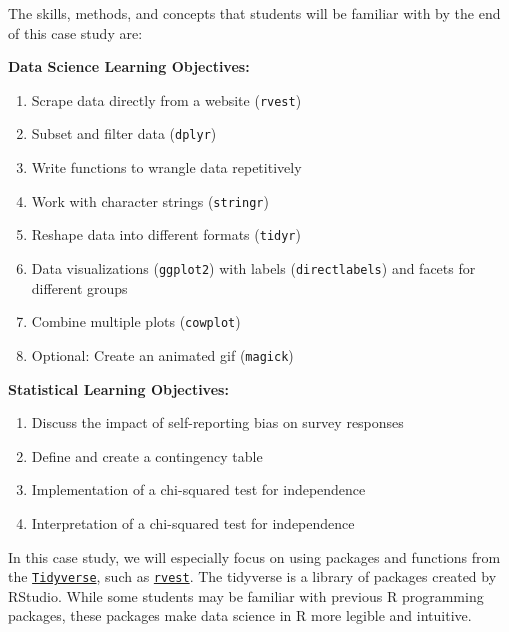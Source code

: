 \documentclass[
]{article}
\providecommand{\tightlist}{%
  \setlength{\itemsep}{0pt}\setlength{\parskip}{0pt}}
\begin{document}
The skills, methods, and concepts that students will be familiar with by
the end of this case study are:

\textbf{Data Science Learning Objectives:}

\begin{enumerate}
\def\labelenumi{\arabic{enumi}.}
\tightlist
\item
  Scrape data directly from a website (\texttt{rvest})\\
\item
  Subset and filter data (\texttt{dplyr})\\
\item
  Write functions to wrangle data repetitively\\
\item
  Work with character strings (\texttt{stringr})\\
\item
  Reshape data into different formats (\texttt{tidyr})\\
\item
  Data visualizations (\texttt{ggplot2}) with labels
  (\texttt{directlabels}) and facets for different groups\\
\item
  Combine multiple plots (\texttt{cowplot})\\
\item
  Optional: Create an animated gif (\texttt{magick})
\end{enumerate}

\textbf{Statistical Learning Objectives:}

\begin{enumerate}
\def\labelenumi{\arabic{enumi}.}
\tightlist
\item
  Discuss the impact of self-reporting bias on survey responses\\
\item
  Define and create a contingency table\\
\item
  Implementation of a chi-squared test for independence\\
\item
  Interpretation of a chi-squared test for independence
\end{enumerate}

In this case study, we will especially focus on using packages and
functions from the
\href{https://www.tidyverse.org/}{\texttt{Tidyverse}}, such as
\href{https://github.com/tidyverse/rvest}{\texttt{rvest}}. The tidyverse
is a library of packages created by RStudio. While some students may be
familiar with previous R programming packages, these packages make data
science in R more legible and intuitive.
\end{document}
